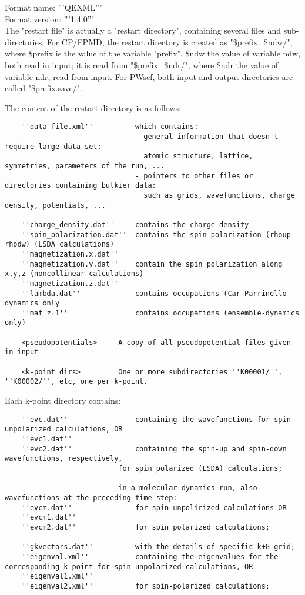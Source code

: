 \documentclass[12pt,a4paper]{article}
\begin{document}
Format name: '''QEXML''' \\
Format version: '''1.4.0''' \\

The "restart file" is actually a "restart directory", containing several files and sub-directories. 
For CP/FPMD, the restart directory is created as "\$prefix\_\$ndw/", where \$prefix is the value of the 
variable "prefix". \$ndw the value of variable ndw, both read in input; it is read from "\$prefix\_\$ndr/", 
where \$ndr the value of variable ndr, read from input.
For PWscf, both input and output directories are called 
"\$prefix.save/".

The content of the restart directory is as follows:
\begin{verbatim}
    ''data-file.xml''          which contains:
                               - general information that doesn't require large data set: 
                                 atomic structure, lattice, symmetries, parameters of the run, ...
                               - pointers to other files or directories containing bulkier data:
                                 such as grids, wavefunctions, charge density, potentials, ...
      
    ''charge_density.dat''     contains the charge density
    ''spin_polarization.dat''  contains the spin polarization (rhoup-rhodw) (LSDA calculations)
    ''magnetization.x.dat''    
    ''magnetization.y.dat''    contain the spin polarization along x,y,z (noncollinear calculations)  
    ''magnetization.z.dat'' 
    ''lambda.dat''             contains occupations (Car-Parrinello dynamics only
    ''mat_z.1''                contains occupations (ensemble-dynamics only)
    
    <pseudopotentials>     A copy of all pseudopotential files given in input
    
    <k-point dirs>         One or more subdirectories ''K00001/'', ''K00002/'', etc, one per k-point.
\end{verbatim}
Each k-point directory contains:
\begin{verbatim}
    ''evc.dat''                containing the wavefunctions for spin-unpolarized calculations, OR
    ''evc1.dat''
    ''evc2.dat''               containing the spin-up and spin-down wavefunctions, respectively, 
                           for spin polarized (LSDA) calculations;
  
                           in a molecular dynamics run, also wavefunctions at the preceding time step:
    ''evcm.dat''               for spin-unpolirized calculations OR
    ''evcm1.dat''
    ''evcm2.dat''              for spin polarized calculations;
     
    ''gkvectors.dat''          with the details of specific k+G grid;
    ''eigenval.xml''           containing the eigenvalues for the corresponding k-point for spin-unpolarized calculations, OR
    ''eigenval1.xml''      
    ''eigenval2.xml''          for spin-polarized calculations;
\end{verbatim}
\end{document}
